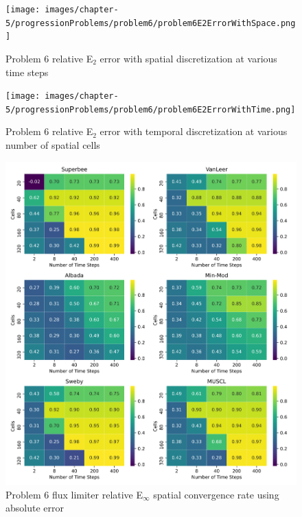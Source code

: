 \begin{figure}[p]
    \centering
    \texttt{[image: images/chapter-5/progressionProblems/problem6/problem6E2ErrorWithSpace.png]}
    \caption{Problem 6 relative E${}_{2}$ error with spatial discretization at various time steps }
    \label{fig:problem6_l2error_spatial_results}
\end{figure}

\clearpage

\begin{figure}[p]
    \centering
    \texttt{[image: images/chapter-5/progressionProblems/problem6/problem6E2ErrorWithTime.png]}
    \caption{Problem 6 relative E${}_{2}$ error with temporal discretization at various number of spatial cells}
    \label{fig:problem6_l2error_time_results}
\end{figure}

\clearpage

\begin{figure}[p]
    \centering
    \includegraphics[width=6in]{images/chapter-5/progressionProblems/problem6/problem6EinftyFluxLimiterConvergenceRate.png}
    \caption{Problem 6 flux limiter relative E${}_{\infty}$ spatial convergence rate using absolute error}
    \label{fig:problem6_linferror_fluxlimiter_convergence_rate}
\end{figure}

